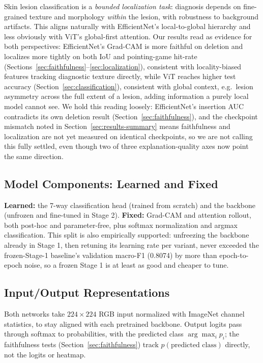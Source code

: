 \documentclass[10pt,twocolumn,letterpaper]{article}
\begin{document}
Skin lesion classification is a \emph{bounded localization task}: diagnosis
depends on fine-grained texture and morphology \emph{within} the lesion, with
robustness to background artifacts. This aligns naturally with EfficientNet's
local-to-global hierarchy and less obviously with ViT's global-first
attention. Our results read as evidence for both perspectives: EfficientNet's
Grad-CAM is more faithful on deletion and localizes more tightly on both IoU
and pointing-game hit-rate (Sections~\ref{sec:faithfulness}--\ref{sec:localization}),
consistent with locality-biased features tracking diagnostic texture
directly, while ViT reaches higher test accuracy
(Section~\ref{sec:classification}), consistent with global context, e.g.\
lesion asymmetry across the full extent of a lesion, adding information a
purely local model cannot see. We hold this reading loosely: EfficientNet's
insertion AUC contradicts its own deletion result
(Section~\ref{sec:faithfulness}), and the checkpoint mismatch noted in
Section~\ref{sec:results-summary} means faithfulness and localization are not
yet measured on identical checkpoints, so we are not calling this fully
settled, even though two of three explanation-quality axes now point the same
direction.

\subsection{Model Components: Learned and Fixed}

\textbf{Learned:} the 7-way classification head (trained from scratch) and
the backbone (unfrozen and fine-tuned in Stage 2). \textbf{Fixed:} Grad-CAM
and attention rollout, both post-hoc and parameter-free, plus softmax
normalization and argmax classification. This split is also empirically
supported: unfreezing the backbone already in Stage 1, then retuning its
learning rate per variant, never exceeded the frozen-Stage-1 baseline's
validation macro-F1 (0.8074) by more than epoch-to-epoch noise, so a frozen
Stage 1 is at least as good and cheaper to tune.

\subsection{Input/Output Representations}

Both networks take $224\times224$ RGB input normalized with ImageNet channel
statistics, to stay aligned with each pretrained backbone. Output logits pass
through softmax to probabilities, with the predicted class $\arg\max_i p_i$;
the faithfulness tests (Section~\ref{sec:faithfulness}) track
$p(\text{predicted class})$ directly, not the logits or heatmap.
\end{document}

